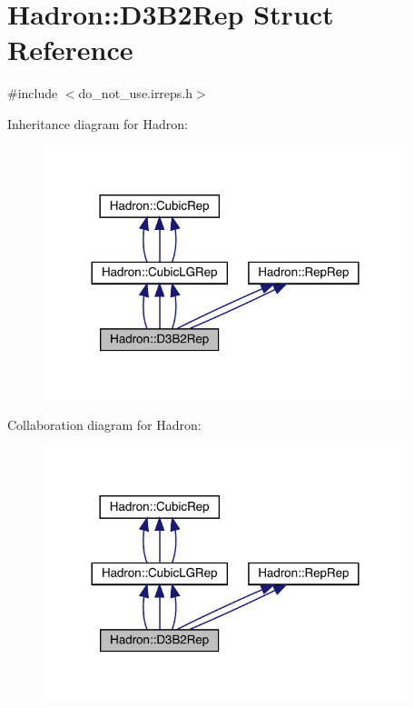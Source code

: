 \hypertarget{structHadron_1_1D3B2Rep}{}\section{Hadron\+:\+:D3\+B2\+Rep Struct Reference}
\label{structHadron_1_1D3B2Rep}


{\ttfamily \#include $<$do\+\_\+not\+\_\+use.\+irreps.\+h$>$}



Inheritance diagram for Hadron\+:
\nopagebreak
\begin{figure}[H]
\begin{center}
\leavevmode
\includegraphics[width=300pt]{d2/d25/structHadron_1_1D3B2Rep__inherit__graph}
\end{center}
\end{figure}


Collaboration diagram for Hadron\+:
\nopagebreak
\begin{figure}[H]
\begin{center}
\leavevmode
\includegraphics[width=300pt]{de/dec/structHadron_1_1D3B2Rep__coll__graph}
\end{center}
\end{figure}
